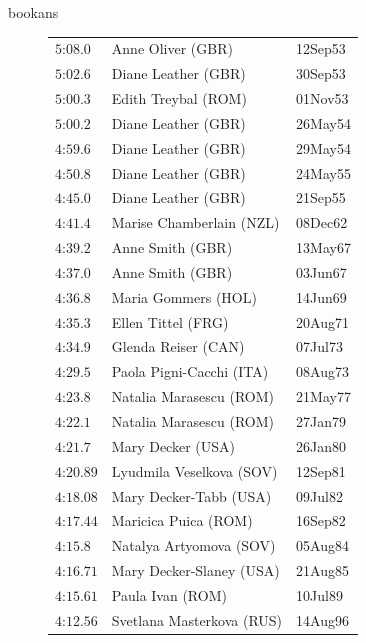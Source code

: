 \begin{exercises}
\begin{Filesave}{bookans}
\begin{figure}
{{\begin{tabular}[t]{|l|ll|}
           $\text{5:08}.0$    &Anne Oliver (GBR)           &12Sep53 \\
           $\text{5:02}.6$    &Diane Leather (GBR)         &30Sep53 \\
           $\text{5:00}.3$    &Edith Treybal (ROM)         &01Nov53 \\
           $\text{5:00}.2$    &Diane Leather (GBR)         &26May54 \\
           $\text{4:59}.6$    &Diane Leather (GBR)         &29May54 \\
           $\text{4:50}.8$    &Diane Leather (GBR)         &24May55 \\
           $\text{4:45}.0$    &Diane Leather (GBR)         &21Sep55 \\
           $\text{4:41}.4$    &Marise Chamberlain (NZL)    &08Dec62 \\
           $\text{4:39}.2$    &Anne Smith (GBR)            &13May67 \\
           $\text{4:37}.0$    &Anne Smith (GBR)            &03Jun67 \\
           $\text{4:36}.8$    &Maria Gommers (HOL)         &14Jun69 \\
           $\text{4:35}.3$    &Ellen Tittel (FRG)          &20Aug71 \\
           $\text{4:34}.9$    &Glenda Reiser (CAN)         &07Jul73 \\
           $\text{4:29}.5$    &Paola Pigni-Cacchi (ITA)    &08Aug73 \\
           $\text{4:23}.8$    &Natalia Marasescu (ROM)     &21May77 \\
           $\text{4:22}.1$    &Natalia Marasescu (ROM)     &27Jan79 \\
           $\text{4:21}.7$    &Mary Decker (USA)           &26Jan80 \\
           $\text{4:20}.89$   &Lyudmila Veselkova (SOV)    &12Sep81 \\
           $\text{4:18}.08$   &Mary Decker-Tabb (USA)      &09Jul82 \\
           $\text{4:17}.44$   &Maricica Puica (ROM)        &16Sep82 \\
           $\text{4:15}.8$    &Natalya Artyomova (SOV)     &05Aug84 \\
           $\text{4:16}.71$   &Mary Decker-Slaney (USA)    &21Aug85 \\
           $\text{4:15}.61$   &Paula Ivan (ROM)            &10Jul89 \\
           $\text{4:12}.56$   &Svetlana Masterkova (RUS)   &14Aug96 \\

\end{tabular}}}
\end{figure}
\end{Filesave}
\end{exercises}
